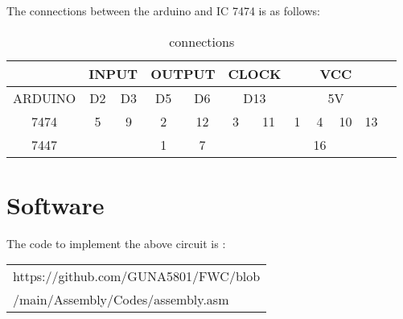 \documentclass{article}
\begin{document}
 The connections between the arduino and IC 7474 is as follows:
 \begin{table}[h]
  \begin{center}
   \begin{tabular}{|c|c|c|c|c|c|c|c|c|c|c|c|}
\hline  & \multicolumn{2}{|c|}{INPUT} & \multicolumn{2}{|c|}{OUTPUT} & \multicolumn{2}{|c|}{CLOCK} & \multicolumn{4}{|c|}{VCC} \\
\hline ARDUINO & D2 & D3 & D5 & D6 & \multicolumn{2}{|c|}{D13} & \multicolumn{4}{|c|}{5V} \\
\hline 7474 & 5 & 9 & 2 & 12 & 3 & 11 & 1 & 4 & 10 & 13 \\
\hline 7447 &  &  & 1 & 7 &  &  &  & 16 &  & \\
\hline
\end{tabular}
   \caption{connections}
   \label{table:3}
  \end{center}
 \end{table}


\section{Software}
The code to implement the above circuit is : \\

\begin{tabularx}{0.46\textwidth} { 
  | >{\centering\arraybackslash}X |}
  \hline
  https://github.com/GUNA5801/FWC/blob\\/main/Assembly/Codes/assembly.asm\\
  \hline
\end{tabularx}
\end{document}
